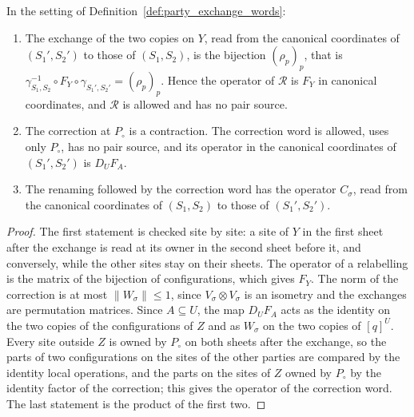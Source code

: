 \begin{theorem}
    \label{thm:party_exchange_words}
    \leanok
    In the setting of Definition~\ref{def:party_exchange_words}:
    \begin{enumerate}
        \item The exchange of the two copies on $Y$, read from the canonical coordinates of
              $(S_1',S_2')$ to those of $(S_1,S_2)$, is the bijection $(\rho_p)_p$, that is
              $\gamma_{S_1,S_2}^{-1}\circ F_Y\circ\gamma_{S_1',S_2'}=(\rho_p)_p$. Hence the operator
              of $\mathcal R$ is $F_Y$ in canonical coordinates, and $\mathcal R$ is allowed and
              has no pair source.
        \item The correction at $P_\circ$ is a contraction. The correction word is allowed, uses
              only $P_\circ$, has no pair source, and its operator in the canonical coordinates of
              $(S_1',S_2')$ is $D_UF_A$.
        \item The renaming followed by the correction word has the operator $C_\sigma$, read from
              the canonical coordinates of $(S_1,S_2)$ to those of $(S_1',S_2')$.
    \end{enumerate}
\end{theorem}
\begin{proof}\leanok
    The first statement is checked site by site: a site of $Y$ in the first sheet after the
    exchange is read at its owner in the second sheet before it, and conversely, while the other
    sites stay on their sheets. The operator of a relabelling is the matrix of the bijection of
    configurations, which gives $F_Y$. The norm of the correction is at most
    $\lVert W_\sigma\rVert\leq1$, since $V_\sigma\otimes V_\sigma$ is an isometry and the
    exchanges are permutation matrices. Since $A\subseteq U$, the map $D_UF_A$ acts as the
    identity on the two copies of the configurations of $Z$ and as $W_\sigma$ on the two copies
    of $[q]^U$. Every site outside $Z$ is owned by $P_\circ$ on both sheets after the exchange,
    so the parts of two configurations on the sites of the other parties are compared by the
    identity local operations, and the parts on the sites of $Z$ owned by $P_\circ$ by the
    identity factor of the correction; this gives the operator of the correction word. The last
    statement is the product of the first two.
\end{proof}

